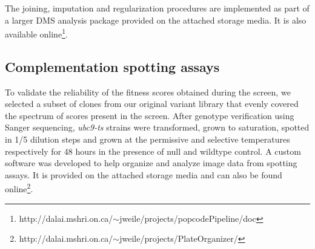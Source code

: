 The joining, imputation and regularization procedures are implemented as part of a larger DMS analysis package provided on the attached storage media. It is also available online\footnote{http://dalai.mshri.on.ca/$\sim$jweile/projects/popcodePipeline/doc}.

\subsection{Complementation spotting assays}
To validate the reliability of the fitness scores obtained during the screen, we selected a subset of clones from our original variant library that evenly covered the spectrum of scores present in the screen. After genotype verification using Sanger sequencing,  \textit{ubc9-ts} strains were transformed, grown to saturation, spotted in 1/5 dilution steps and grown at the permissive and selective temperatures respectively for 48 hours in the presence of null and wildtype control. A custom software was developed to help organize and analyze image data from spotting assays. It is provided on the attached storage media and can also be found online\footnote{http://dalai.mshri.on.ca/$\sim$jweile/projects/PlateOrganizer/}.

